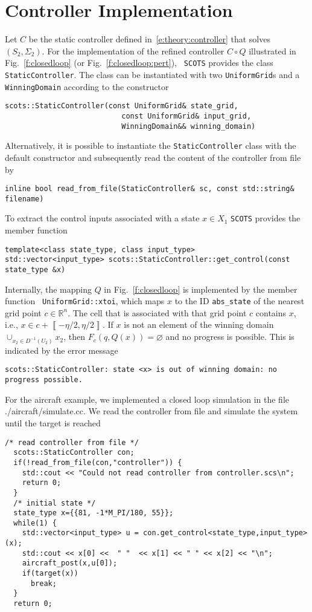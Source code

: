 \documentclass[a4paper]{amsart}
\newcommand{\segcc}[1]{\ensuremath{{\left\llbracket#1\right\rrbracket}}}
\newcommand{\R}{\mathbb{R}}
\renewcommand{\emptyset}{{\varnothing}}
\begin{document}
\section{Controller Implementation}
\label{s:usage:simulation}
Let $C$ be the static controller defined in~\eqref{e:theory:controller} that
solves $(S_2,\Sigma_2)$. For the implementation of the refined controller $C\circ Q$
illustrated in Fig.~\ref{f:closedloop} (or Fig.~\ref{f:closedloop:pert}),  {\tt
SCOTS} provides the class {\tt StaticController}. The class can be instantiated with two {\tt UniformGrid}s and a {\tt
WinningDomain} according to the constructor
\begin{lstlisting}[basicstyle=\small\ttfamily]
scots::StaticController(const UniformGrid& state_grid,
                           const UniformGrid& input_grid,
                           WinningDomain&& winning_domain)
\end{lstlisting}
Alternatively, it is possible to instantiate the {\tt StaticController} class with the
default constructor and subsequently read the content of the controller from file by
\begin{lstlisting}[basicstyle=\small\ttfamily]
inline bool read_from_file(StaticController& sc, const std::string& filename) 
\end{lstlisting}
To extract the control inputs associated with a state $x\in X_1$ {\tt SCOTS}
provides the member function
\begin{lstlisting}[basicstyle=\small\ttfamily]
template<class state_type, class input_type>
std::vector<input_type> scots::StaticController::get_control(const state_type &x)
\end{lstlisting}
Internally, the mapping $Q$ in Fig.~\ref{f:closedloop}
is implemented by the member function {\tt
UniformGrid::xtoi}, which maps $x$ to the ID {\tt abs\_state} of the nearest
grid point $c\in \R^n$. The cell that is
associated with that grid point $c$ contains $x$, i.e., $x\in
c+\segcc{-\eta/2,\eta/2}$. If $x$ is not an element of the winning domain $\cup_{x_2\in
D^{-1}(U_2)}x_2$, then $F_c(q,Q(x))=\emptyset$ and no progress is possible. This
is indicated by the error message
\begin{lstlisting}[basicstyle=\small\ttfamily]
scots::StaticController: state <x> is out of winning domain: no progress possible.
\end{lstlisting}

For the aircraft example, we implemented a closed loop simulation in the file
{./aircraft/simulate.cc}. We read the controller from file and simulate the
system until the target is reached
\begin{lstlisting}[basicstyle=\small\ttfamily]
  /* read controller from file */
  scots::StaticController con;
  if(!read_from_file(con,"controller")) {
    std::cout << "Could not read controller from controller.scs\n";
    return 0;
  }
  /* initial state */
  state_type x={{81, -1*M_PI/180, 55}};
  while(1) {
    std::vector<input_type> u = con.get_control<state_type,input_type>(x);
    std::cout << x[0] <<  " "  << x[1] << " " << x[2] << "\n";
    aircraft_post(x,u[0]);
    if(target(x)) 
      break;
  }
  return 0;
\end{lstlisting}
\end{document}
